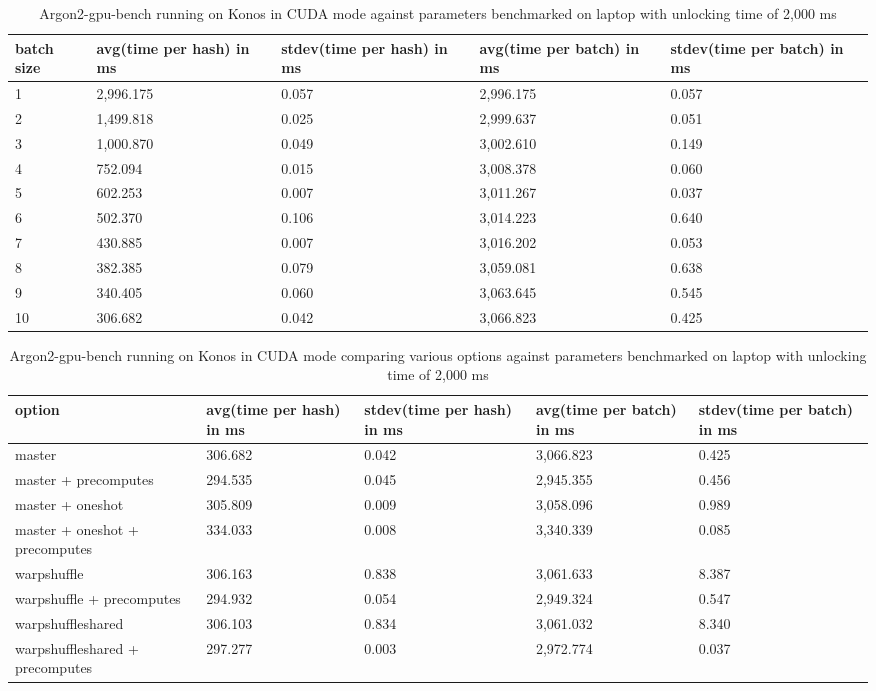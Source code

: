\documentclass[nolof]{fithesis3}
\begin{document}
\noindent
\begin{table}
\caption{Argon2-gpu-bench running on Konos in CUDA mode against parameters benchmarked on laptop with unlocking time of 2,000 ms}
\label{tab:konosgpu}
\begin{tabularx}{\textwidth}{| X | X | X | X | X |}
\hline
batch size & avg(time per hash) in ms & stdev(time per hash) in ms & avg(time per batch) in ms & stdev(time per batch) in ms\\
\hline
1 & 2,996.175 & 0.057 & 2,996.175 & 0.057\\
\hline
2 & 1,499.818 & 0.025 & 2,999.637 & 0.051\\
\hline
3 & 1,000.870 & 0.049 & 3,002.610 & 0.149\\
\hline
4 & 752.094 & 0.015 & 3,008.378 & 0.060\\
\hline
5 & 602.253 & 0.007 & 3,011.267 & 0.037\\
\hline
6 & 502.370 & 0.106 & 3,014.223 & 0.640\\
\hline
7 & 430.885 & 0.007 & 3,016.202 & 0.053\\
\hline
8 & 382.385 & 0.079 & 3,059.081 & 0.638\\
\hline
9 & 340.405 & 0.060 & 3,063.645 & 0.545\\
\hline
10 & 306.682 & 0.042 & 3,066.823 & 0.425\\
\hline
\end{tabularx}
\end{table}


\noindent
\begin{table}
\caption{Argon2-gpu-bench running on Konos in CUDA mode comparing various options against parameters benchmarked on laptop with unlocking time of 2,000 ms}
\label{tab:konosgpuopt}
\begin{tabularx}{\textwidth}{| X | X | X | X | X |}
\hline
option & avg(time per hash) in ms & stdev(time per hash) in ms & avg(time per batch) in ms & stdev(time per batch) in ms\\
\hline
master & 306.682 & 0.042 & 3,066.823 & 0.425 \\
\hline
master + precomputes & 294.535 & 0.045 & 2,945.355 & 0.456 \\
\hline
master + oneshot & 305.809 & 0.009 & 3,058.096 & 0.989 \\
\hline
master + oneshot + precomputes & 334.033 & 0.008 & 3,340.339 & 0.085 \\
\hline
warp\-shuffle & 306.163 & 0.838 & 3,061.633 & 8.387 \\
\hline
warpshuffle + precomputes & 294.932 & 0.054 & 2,949.324 & 0.547\\
\hline
warp\-shuffle\-shared & 306.103 & 0.834 & 3,061.032 & 8.340\\
\hline
warp\-shuffle\-shared + precomputes & 297.277 & 0.003 & 2,972.774 & 0.037\\
\hline
\end{tabularx}
\end{table}
\end{document}
